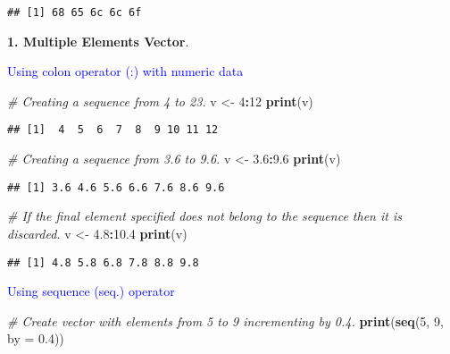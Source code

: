 \documentclass[
]{article}
\newenvironment{Shaded}{\begin{snugshade}}{\end{snugshade}}
\newcommand{\AttributeTok}[1]{\textcolor[rgb]{0.13,0.29,0.53}{#1}}
\newcommand{\CommentTok}[1]{\textcolor[rgb]{0.56,0.35,0.01}{\textit{#1}}}
\newcommand{\DecValTok}[1]{\textcolor[rgb]{0.00,0.00,0.81}{#1}}
\newcommand{\FloatTok}[1]{\textcolor[rgb]{0.00,0.00,0.81}{#1}}
\newcommand{\FunctionTok}[1]{\textcolor[rgb]{0.13,0.29,0.53}{\textbf{#1}}}
\newcommand{\NormalTok}[1]{#1}
\newcommand{\OtherTok}[1]{\textcolor[rgb]{0.56,0.35,0.01}{#1}}
\newcommand{\SpecialCharTok}[1]{\textcolor[rgb]{0.81,0.36,0.00}{\textbf{#1}}}
\begin{document}
\begin{verbatim}
## [1] 68 65 6c 6c 6f
\end{verbatim}

\textbf{1. Multiple Elements Vector}.

\textcolor{blue}{Using colon operator (:) with numeric data}

\begin{Shaded}
\begin{Highlighting}[]
\CommentTok{\# Creating a sequence from 4 to 23.}
\NormalTok{v }\OtherTok{\textless{}{-}} \DecValTok{4}\SpecialCharTok{:}\DecValTok{12}
\FunctionTok{print}\NormalTok{(v)}
\end{Highlighting}
\end{Shaded}

\begin{verbatim}
## [1]  4  5  6  7  8  9 10 11 12
\end{verbatim}

\begin{Shaded}
\begin{Highlighting}[]
\CommentTok{\# Creating a sequence from 3.6 to 9.6.}
\NormalTok{v }\OtherTok{\textless{}{-}} \FloatTok{3.6}\SpecialCharTok{:}\FloatTok{9.6}
\FunctionTok{print}\NormalTok{(v)}
\end{Highlighting}
\end{Shaded}

\begin{verbatim}
## [1] 3.6 4.6 5.6 6.6 7.6 8.6 9.6
\end{verbatim}

\begin{Shaded}
\begin{Highlighting}[]
\CommentTok{\# If the final element specified does not belong to the sequence then it is discarded.}
\NormalTok{v }\OtherTok{\textless{}{-}} \FloatTok{4.8}\SpecialCharTok{:}\FloatTok{10.4}
\FunctionTok{print}\NormalTok{(v)}
\end{Highlighting}
\end{Shaded}

\begin{verbatim}
## [1] 4.8 5.8 6.8 7.8 8.8 9.8
\end{verbatim}

\textcolor{blue}{Using sequence (seq.) operator}

\begin{Shaded}
\begin{Highlighting}[]
\CommentTok{\# Create vector with elements from 5 to 9 incrementing by 0.4.}
\FunctionTok{print}\NormalTok{(}\FunctionTok{seq}\NormalTok{(}\DecValTok{5}\NormalTok{, }\DecValTok{9}\NormalTok{, }\AttributeTok{by =} \FloatTok{0.4}\NormalTok{))}
\end{Highlighting}
\end{Shaded}
\end{document}
